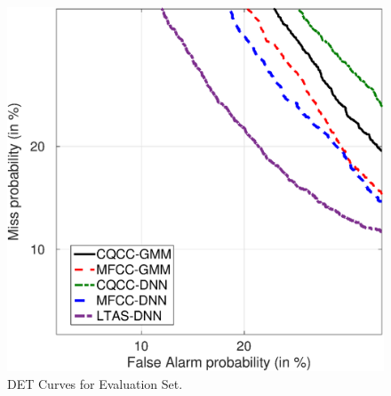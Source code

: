 \documentclass{article}
\begin{document}
\begin{figure}[!t]
    \centering
    \includegraphics[scale=0.35]{./Images/eval-dets.eps}
    \caption{DET Curves for Evaluation Set.}
    \label{eval_det}
\end{figure}



\end{document}
